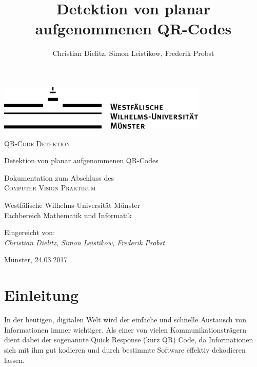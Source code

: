 \documentclass[a4paper, oneside, 12pt]{article}
\title{Detektion von planar aufgenommenen QR-Codes}
\author{Christian Dielitz, Simon Leistikow, Frederik Probst}
\begin{document}
\thispagestyle{empty}  %

\hspace*{1em}
\begin{center}
	\includegraphics[width=10cm]{images/wwu_logo}
	\par
	\vspace*{8ex}
	\Huge
	\Large\textsc{QR-Code Detektion}
	
	\vspace{10pt}
	\large Detektion von planar aufgenommenen QR-Codes
	
	\par
	\normalsize
	\vspace*{8ex}
	\normalsize
	Dokumentation zum Abschluss des\\
	\large
	\textsc{Computer Vision Praktikum}
	\par
	\normalsize
	\vspace*{12ex}
	Westfälische Wilhelms-Universität Münster\\
	Fachbereich Mathematik und Informatik\\
\end{center}
\par

\vspace*{34ex}
Eingereicht von:\\
\large
\textit{Christian Dielitz, Simon Leistikow, Frederik Probst}
\par
\normalsize
\vspace*{4ex}
Münster, 24.03.2017
\vfill
\hspace*{1em}



\newpage
\tableofcontents
\listoffigures

\newpage

\section{Einleitung}
\label{s:einleitung}
In der heutigen, digitalen Welt wird der einfache und schnelle Austausch von Informationen immer wichtiger. Als einer von vielen Kommunikationsträgern dient dabei der sogenannte Quick Response (kurz QR) Code, da Informationen sich mit ihm gut kodieren und durch bestimmte Software effektiv dekodieren lassen.
\end{document}
